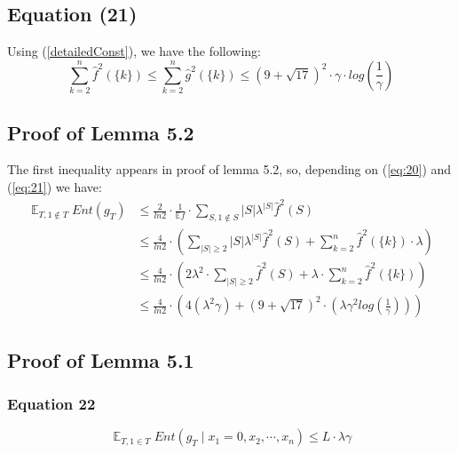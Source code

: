 \documentclass{article}
\begin{document}
		\subsection{Equation (21)}
			Using (\ref{detailedConst}), we have the following:
			\begin{equation} \label{eq:21}
				\sum_{k=2}^n \hat{f}^2 \left( \{k\} \right) 
				\leq \sum_{k=2}^n \hat{g}^2 \left( \{k\} \right) 
				\leq \left( 9 + \sqrt{17} \right) ^ 2 \cdot \gamma \cdot log \left( \frac{1}{\gamma} \right)
			\end{equation}
	
		\subsection{Proof of Lemma 5.2}
			The first inequality appears in proof of lemma 5.2, so, depending on (\ref{eq:20}) and (\ref{eq:21}) we have:
			\begin{equation} \label{lemma5:2}\begin{aligned}
				\mathop{\mathbb{E}}_{T, 1 \notin T} Ent(g_T)
				& \leq \frac{2}{ln2} \cdot \frac{1}{\mathbb{E} f} \cdot \sum_{S, 1 \notin S} |S| \lambda^{|S|} \hat{f}^2(S) \\
				& \leq \frac{4}{ln2} \cdot \left( \sum_{|S| \geq 2} |S| \lambda^{|S|} \hat{f}^2(S) + \sum_{k=2}^n \hat{f}^2 \left( \{k\} \right) \cdot \lambda \right) \\
				& \leq \frac{4}{ln2}  \cdot \left( 2 \lambda^2 \cdot \sum_{|S| \geq 2} \hat{f}^2(S) + \lambda \cdot \sum_{k=2}^n \hat{f}^2 \left( \{k\} \right) \right) \\
				& \leq \frac{4}{ln2} \cdot \left( 4 ( \lambda^2 \gamma ) + \left( 9 + \sqrt{17} \right)^2 \cdot \left( \lambda \gamma^2 log \left( \frac{1}{\gamma} \right) \right) \right)
			\end{aligned}
			\end{equation}
		
		\newpage
		\subsection{Proof of Lemma 5.1}
			\subsubsection{Equation 22}
				\begin{equation}
					\mathop{\mathbb{E}}_{T,1 \in T} Ent \left( g_T \mid x_1 = 0,x_2, \cdots, x_n \right) \leq L \cdot \lambda \gamma
				\end{equation}
            
\end{document}

